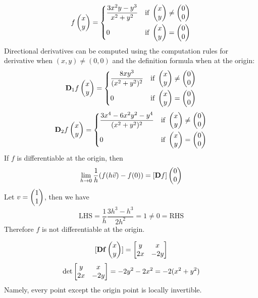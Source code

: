 \documentclass{homework}
\begin{document}
\begin{problem}{2}
$$f\begin{pmatrix}x\\y\end{pmatrix} =
\begin{dcases}
\frac{3x^2y-y^3}{x^2+y^2} & \text{if } \begin{pmatrix}x\\y\end{pmatrix} \neq \begin{pmatrix}0\\0\end{pmatrix} \\
0                         & \text{if } \begin{pmatrix}x\\y\end{pmatrix} = \begin{pmatrix}0\\0\end{pmatrix}
\end{dcases}$$
Directional derivatives can be computed using the computation rules for derivative when $(x, y) \ne (0, 0)$ and the definition formula when at the origin:
$$\mathbf{D}_1f\begin{pmatrix}x\\y\end{pmatrix} =
\begin{dcases}
\frac{8xy^3}{(x^2+y^2)^2} & \text{if } \begin{pmatrix}x\\y\end{pmatrix} \neq \begin{pmatrix}0\\0\end{pmatrix} \\
0                         & \text{if } \begin{pmatrix}x\\y\end{pmatrix} = \begin{pmatrix}0\\0\end{pmatrix}
\end{dcases}$$
$$\mathbf{D}_2f\begin{pmatrix}x\\y\end{pmatrix} =
\begin{dcases}
\frac{3x^4-6x^2y^2-y^4}
{(x^2+y^2)^2} & \text{if } \begin{pmatrix}x\\y\end{pmatrix} \neq \begin{pmatrix}0\\0\end{pmatrix} \\
0             & \text{if } \begin{pmatrix}x\\y\end{pmatrix} = \begin{pmatrix}0\\0\end{pmatrix}
\end{dcases}$$
If $f$ is differentiable at the origin, then
$$\lim_{h \to 0} \frac{1}{h}(f(h\vec{v}) - f(0)) = [\mathbf{D}f]\begin{pmatrix}0\\0\end{pmatrix}$$
Let $v = \begin{pmatrix}1\\1\end{pmatrix}$, then we have
$$\mathrm{LHS} = \frac{1}{h}\frac{3h^3-h^3}{2h^2} = 1 \neq 0 = \mathrm{RHS}$$
Therefore $f$ is not differentiable at the origin.
\end{problem}

\begin{problem}{3}
$$[\mathbf{Df}\begin{pmatrix}x\\y\end{pmatrix}] = \begin{bmatrix}y & x\\2x & -2y\end{bmatrix}$$
$$\det\begin{bmatrix}y & x\\2x & -2y\end{bmatrix} = -2y^2 - 2x^2 = -2(x^2+y^2)$$
Namely, every point except the origin point is locally invertible.
\end{problem}
\end{document}
